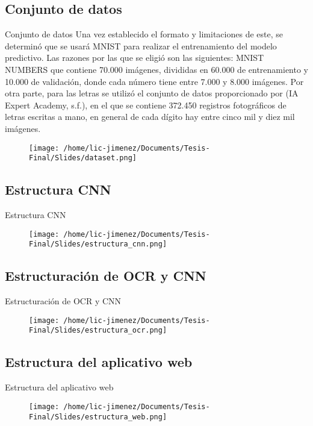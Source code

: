 \documentclass{beamer}
\begin{document}
\subsection{Conjunto de datos}
\begin{frame}{Conjunto de datos}
    Una vez establecido el formato y limitaciones de este, se determinó que se usará MNIST para realizar el entrenamiento del modelo predictivo. Las razones por las que se eligió son las siguientes: MNIST NUMBERS que contiene 70.000 imágenes, divididas en 60.000 de entrenamiento y 10.000 de validación, donde cada número tiene entre 7.000 y 8.000 imágenes. Por otra parte, para las letras se utilizó el conjunto de datos proporcionado por (IA Expert Academy, s.f.), en el que se contiene 372.450 registros fotográficos de letras escritas a mano, en general de cada dígito hay entre cinco mil y diez mil imágenes. 
    \begin{figure}
        \centering
        \texttt{[image: /home/lic-jimenez/Documents/Tesis-Final/Slides/dataset.png]}
    \end{figure}
\end{frame}


\subsection{Estructura CNN}
\begin{frame}{Estructura CNN}
    \begin{figure}
        \centering
        \texttt{[image: /home/lic-jimenez/Documents/Tesis-Final/Slides/estructura\_cnn.png]}
    \end{figure}
\end{frame}



\subsection{Estructuración de OCR y CNN}
\begin{frame}{Estructuración de OCR y CNN}
    \begin{figure}
        \centering
        \texttt{[image: /home/lic-jimenez/Documents/Tesis-Final/Slides/estructura\_ocr.png]}
    \end{figure}
\end{frame}



\subsection{Estructura del aplicativo web}
\begin{frame}{Estructura del aplicativo web}
    \begin{figure}
        \centering
        \texttt{[image: /home/lic-jimenez/Documents/Tesis-Final/Slides/estructura\_web.png]}
    \end{figure}
    
\end{frame}
\end{document}
